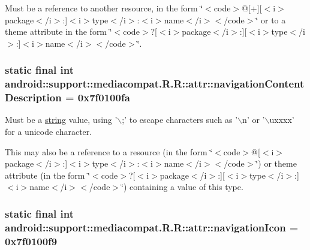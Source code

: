 Must be a reference to another resource, in the form \char`\"{}$<$code$>$@\mbox{[}+\mbox{]}\mbox{[}$<$i$>$package$<$/i$>$:\mbox{]}$<$i$>$type$<$/i$>$:$<$i$>$name$<$/i$>$$<$/code$>$\char`\"{} or to a theme attribute in the form \char`\"{}$<$code$>$?\mbox{[}$<$i$>$package$<$/i$>$:\mbox{]}\mbox{[}$<$i$>$type$<$/i$>$:\mbox{]}$<$i$>$name$<$/i$>$$<$/code$>$\char`\"{}. \hypertarget{classandroid_1_1support_1_1mediacompat_1_1_r_1_1attr_8fb8a0a7c6e3e2f9e2ce4736ace0dfa5}{
\subsubsection[{navigationContentDescription}]{\setlength{\rightskip}{0pt plus 5cm}static final int android::support::mediacompat.R.R::attr::navigationContentDescription = 0x7f0100fa}}
\label{classandroid_1_1support_1_1mediacompat_1_1_r_1_1attr_8fb8a0a7c6e3e2f9e2ce4736ace0dfa5}


Must be a \hyperlink{classandroid_1_1support_1_1mediacompat_1_1_r_1_1string}{string} value, using '$\backslash$;' to escape characters such as '$\backslash$n' or '$\backslash$uxxxx' for a unicode character. 

This may also be a reference to a resource (in the form \char`\"{}$<$code$>$@\mbox{[}$<$i$>$package$<$/i$>$:\mbox{]}$<$i$>$type$<$/i$>$:$<$i$>$name$<$/i$>$$<$/code$>$\char`\"{}) or theme attribute (in the form \char`\"{}$<$code$>$?\mbox{[}$<$i$>$package$<$/i$>$:\mbox{]}\mbox{[}$<$i$>$type$<$/i$>$:\mbox{]}$<$i$>$name$<$/i$>$$<$/code$>$\char`\"{}) containing a value of this type. \hypertarget{classandroid_1_1support_1_1mediacompat_1_1_r_1_1attr_9ce0d05b0f8e92912905c0c8499046af}{
\subsubsection[{navigationIcon}]{\setlength{\rightskip}{0pt plus 5cm}static final int android::support::mediacompat.R.R::attr::navigationIcon = 0x7f0100f9}}
\label{classandroid_1_1support_1_1mediacompat_1_1_r_1_1attr_9ce0d05b0f8e92912905c0c8499046af}


